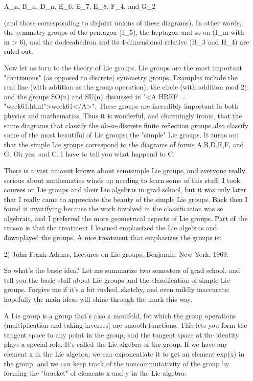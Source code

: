 A_{n}, B_{n}, D_{n}, E_{6}, E_{7}, 
E_{8}, F_{4}, and G_{2}

(and those corresponding to disjoint unions of these diagrams).
In other words, the symmetry groups of the pentagon (I_{5}), the
heptagon and so on (I_{m} with m > 6), and the dodecahedron and its
4-dimensional relative (H_{3} and H_{4}) are ruled out.  

Now let us turn to the theory of Lie groups.  Lie groups are the most
important "continuous" (as opposed to discrete) symmetry
groups.  Examples include the real line (with addition as the group
operation), the circle (with addition mod 2\pi ), and the groups SO(n)
and SU(n) discussed in "<A HREF = "week61.html">week61</A>".
These groups are incredibly important in both physics and mathematics.
Thus it is wonderful, and charmingly ironic, that the same diagrams
that classify the oh-so-discrete finite reflection groups also
classify some of the most beautiful of Lie groups: the
"simple" Lie groups.  It turns out that the simple Lie
groups correspond to the diagrams of forms A,B,D,E,F, and G.  Oh yes,
and C.  I have to tell you what happend to C.

There is a vast amount known about semisimple Lie groups, and everyone
really serious about mathematics winds up needing to learn some of this
stuff.  I took courses on Lie groups and their Lie algebras in grad
school, but it was only later that I really came to appreciate the
beauty of the simple Lie groups.  Back then I found it mystifying
because the work involved in the classification was so algebraic, 
and I preferred the more geometrical aspects of Lie groups.  Part of the
reason is that the treatment I learned emphasized the Lie algebras and
downplayed the groups.  A nice treatment that emphasizes the groups is:

2) John Frank Adams, Lectures on Lie groups, Benjamin, New York, 1969.

So what's the basic idea?  Let me summarize two semesters of grad
school, and tell you the basic stuff about Lie groups and the
classification of simple Lie groups.  Forgive me if it's a bit rushed,
sketchy, and even mildly inaccurate: hopefully the main ideas will shine
through the murk this way.

A Lie group is a group that's also a manifold, for which the group
operations (multiplication and taking inverses) are smooth functions.
This lets you form the tangent space to any point in the group, and
the tangent space at the identity plays a special role.  It's called
the Lie algebra of the group.  If we have any element x in the Lie
algebra, we can exponentiate it to get an element exp(x) in the group,
and we can keep track of the noncommutativity of the group by forming
the "bracket" of elements x and y in the Lie algebra:

